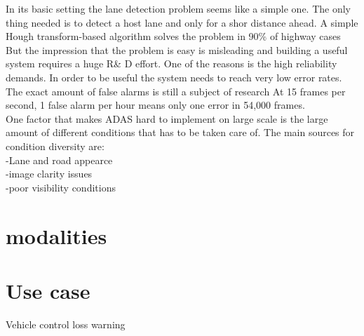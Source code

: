In its basic setting the lane detection problem seems like a simple one. The only thing needed is to detect a host lane and only for a shor distance ahead. A simple Hough transform-based algorithm solves the problem in 90\% of highway cases %
But the impression that the problem is easy is misleading and building a useful system requires a huge R\& D effort. One of the reasons is the high reliability demands. In order to be useful the system needs to reach very low error rates. The exact amount of false alarms is still a subject of research %
At 15 frames per second, 1 false alarm per hour means only one error in 54,000 frames. \\


One factor that makes ADAS hard to implement on large scale is the large amount of different conditions that has to be taken care of. The main sources for condition diversity are:\\
-Lane and road appearce\\
-image clarity issues\\
-poor visibility conditions\\

\section{modalities}

          
\section{Use case}
Vehicle control loss warning